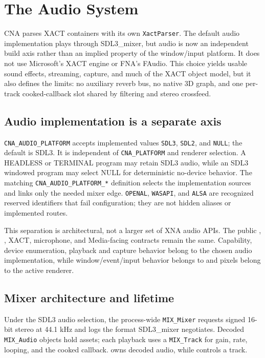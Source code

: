 \chapter{The Audio System}
\label{ch:audio-system}

CNA parses XACT containers with its own \texttt{XactParser}. The default audio implementation
plays through SDL3\_mixer, but audio is now an independent build axis rather than an implied
property of the window/input platform. It does not use Microsoft's XACT engine or FNA's FAudio.
This choice yields usable sound effects, streaming, capture, and much of the XACT object model,
but it also defines the limits: no auxiliary reverb bus, no native 3D graph, and one per-track
cooked-callback slot shared by filtering and stereo crossfeed.

\section{Audio implementation is a separate axis}

\texttt{CNA\_AUDIO\_PLATFORM} accepts implemented values \texttt{SDL3}, \texttt{SDL2}, and
\texttt{NULL}; the default is SDL3. It is independent of \texttt{CNA\_PLATFORM} and renderer
selection. A HEADLESS or TERMINAL program may retain SDL3 audio, while an SDL3 windowed program
may select NULL for deterministic no-device behavior. The matching
\texttt{CNA\_AUDIO\_PLATFORM\_*} definition selects the implementation sources and links only the
needed mixer edge. \texttt{OPENAL}, \texttt{WASAPI}, and \texttt{ALSA} are recognized reserved
identifiers that fail configuration; they are not hidden aliases or implemented routes.

This separation is architectural, not a larger set of XNA audio APIs. The public
, , XACT, microphone, and Media-facing
contracts remain the same. Capability, device enumeration, playback and capture behavior belong
to the chosen audio implementation, while window/event/input behavior belongs to
 and pixels belong to the active renderer.

\section{Mixer architecture and lifetime}

Under the SDL3 audio selection, the process-wide \texttt{MIX\_Mixer} requests signed 16-bit stereo at 44.1 kHz and logs the
format SDL3\_mixer negotiates. Decoded \texttt{MIX\_Audio} objects hold assets; each playback
uses a \texttt{MIX\_Track} for gain, rate, looping, and the cooked callback.
 owns decoded audio, while  controls a
track.

